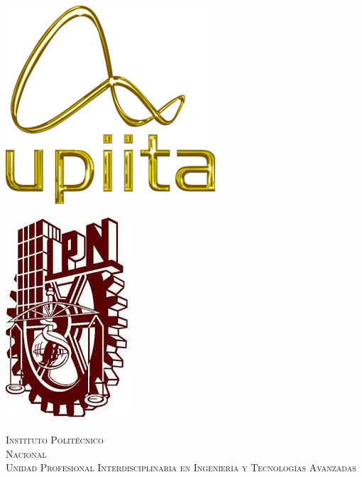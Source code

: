 \begin{center}
	\newcommand{\HRule}{\rule{\linewidth}{0.5mm}}

	\begin{minipage}{0.48\textwidth} \begin{flushleft}
			\includegraphics[scale = 0.63]{Imagenes/logo_upiita}
		\end{flushleft}\end{minipage}
	\begin{minipage}{0.48\textwidth} \begin{flushright}
			\includegraphics[scale = 0.35]{Imagenes/IPN}
		\end{flushright}\end{minipage}

	\vspace*{-1.5cm}
	\textsc{\huge Instituto Politécnico\\ \vspace{5px} Nacional}\\[1.5cm]

	\textsc{\LARGE Unidad Profesional Interdisciplinaria en Ingeniería y
		Tecnologías Avanzadas}\\[1.5cm]


\end{center}
